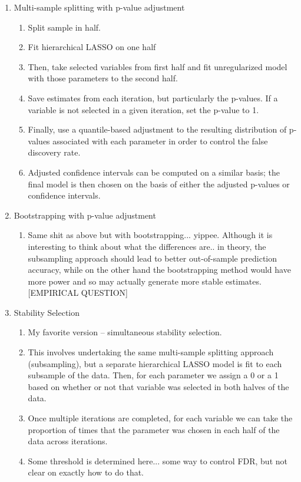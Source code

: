\begin{enumerate}
    \item Multi-sample splitting with p-value adjustment
    \begin{enumerate}
        \item Split sample in half. 
        \item Fit hierarchical LASSO on one half
        \item Then, take selected variables from first half and fit unregularized model with those parameters to the second half.
        \item Save estimates from each iteration, but particularly the p-values. If a variable is not selected in a given iteration, set the p-value to 1. 
        \item Finally, use a quantile-based adjustment to the resulting distribution of p-values associated with each parameter in order to control the false discovery rate.
        \item Adjusted confidence intervals can be computed on a similar basis; the final model is then chosen on the basis of either the adjusted p-values or confidence intervals.
    \end{enumerate}
    \item Bootstrapping with p-value adjustment
    \begin{enumerate}
        \item Same shit as above but with bootstrapping... yippee. Although it is interesting to think about what the differences are.. in theory, the subsampling approach should lead to better out-of-sample prediction accuracy, while on the other hand the bootstrapping method would have more power and so may actually generate more stable estimates. [EMPIRICAL QUESTION]
    \end{enumerate}
    \item Stability Selection
    \begin{enumerate}
        \item My favorite version -- simultaneous stability selection. 
        \item This involves undertaking the same multi-sample splitting approach (subsampling), but a separate hierarchical LASSO model is fit to each subsample of the data. Then, for each parameter we assign a 0 or a 1 based on whether or not that variable was selected in both halves of the data.
        \item Once multiple iterations are completed, for each variable we can take the proportion of times that the parameter was chosen in each half of the data across iterations.
        \item Some threshold is determined here... some way to control FDR, but not clear on exactly how to do that.
    \end{enumerate}
\end{enumerate}


